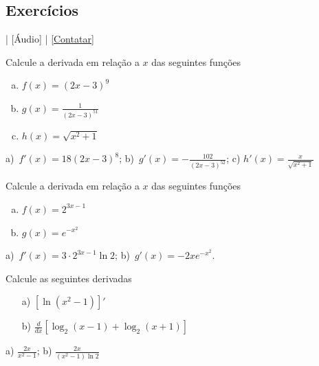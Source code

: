 \subsection*{Exercícios}

\begin{flushright}
  [Vídeo] | [Áudio] | \href{https://phkonzen.github.io/notas/contato.html}{[Contatar]}
\end{flushright}

\begin{exer}
  Calcule a derivada em relação a $x$ das seguintes funções
  \begin{enumerate}[a)]
  \item $\displaystyle f(x) = (2x-3)^{9}$
  \item $\displaystyle g(x) = \frac{1}{(2x-3)^{51}}$
  \item $\displaystyle h(x) = \sqrt{x^2+1}$
  \end{enumerate}
\end{exer}
\begin{resp}
  a)~$\displaystyle f'(x) = 18(2x-3)^8$; b)~$\displaystyle g'(x) = -\frac{102}{(2x-3)^{52}}$; c) $\displaystyle h'(x)=\frac{x}{\sqrt{x^2+1}}$
\end{resp}

\begin{exer}
  Calcule a derivada em relação a $x$ das seguintes funções
  \begin{enumerate}[a)]
  \item $\displaystyle f(x) = 2^{3x-1}$
  \item $\displaystyle g(x) = e^{-x^2}$
  \end{enumerate}
\end{exer}
\begin{resp}
  a)~$\displaystyle f'(x) = 3\cdot 2^{3x-1}\ln 2$; b)~$\displaystyle g'(x) = -2xe^{-x^2}$.
\end{resp}

\begin{exer}
  Calcule as seguintes derivadas
  \begin{enumerate}
  \item[a)] $\displaystyle\left[\ln\left(x^2-1\right)\right]'$ 
  \item[b)] $\displaystyle\frac{d}{dx}\left[\log_2(x-1) + \log_2(x+1)\right]$ 
  \end{enumerate}
\end{exer}
\begin{resp}
  a) $\displaystyle\frac{2x}{x^2-1}$; b) $\displaystyle\frac{2x}{(x^2-1)\ln 2}$
\end{resp}

